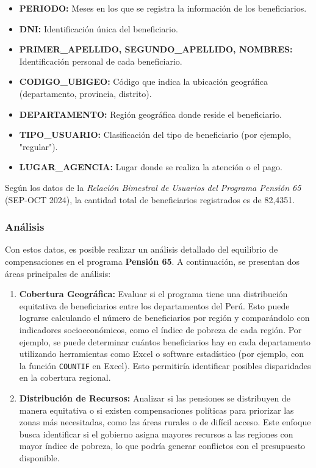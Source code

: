\documentclass[12pt]{article}
\begin{document}
\begin{itemize}
	\item \textbf{PERIODO:} Meses en los que se registra la información de los beneficiarios.
	\item \textbf{DNI:} Identificación única del beneficiario.
	\item \textbf{PRIMER\_APELLIDO, SEGUNDO\_APELLIDO, NOMBRES:} Identificación personal de cada beneficiario.
	\item \textbf{CODIGO\_UBIGEO:} Código que indica la ubicación geográfica (departamento, provincia, distrito).
	\item \textbf{DEPARTAMENTO:} Región geográfica donde reside el beneficiario.
	\item \textbf{TIPO\_USUARIO:} Clasificación del tipo de beneficiario (por ejemplo, "regular").
	\item \textbf{LUGAR\_AGENCIA:} Lugar donde se realiza la atención o el pago.
\end{itemize}

Según los datos de la \textit{Relación Bimestral de Usuarios del Programa Pensión 65} (SEP-OCT 2024), la cantidad total de beneficiarios registrados es de 82,4351.

\subsubsection{Análisis}
Con estos datos, es posible realizar un análisis detallado del equilibrio de compensaciones en el programa \textbf{Pensión 65}. A continuación, se presentan dos áreas principales de análisis:

\begin{enumerate}
	\item \textbf{Cobertura Geográfica:}  
	Evaluar si el programa tiene una distribución equitativa de beneficiarios entre los departamentos del Perú. Esto puede lograrse calculando el número de beneficiarios por región y comparándolo con indicadores socioeconómicos, como el índice de pobreza de cada región.  
	Por ejemplo, se puede determinar cuántos beneficiarios hay en cada departamento utilizando herramientas como Excel o software estadístico (por ejemplo, con la función \texttt{COUNTIF} en Excel). Esto permitiría identificar posibles disparidades en la cobertura regional.
	
	\item \textbf{Distribución de Recursos:}  
	Analizar si las pensiones se distribuyen de manera equitativa o si existen compensaciones políticas para priorizar las zonas más necesitadas, como las áreas rurales o de difícil acceso. Este enfoque busca identificar si el gobierno asigna mayores recursos a las regiones con mayor índice de pobreza, lo que podría generar conflictos con el presupuesto disponible.
\end{enumerate}
\end{document}
